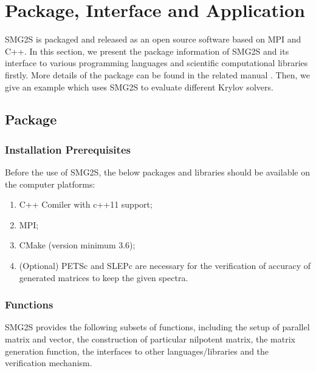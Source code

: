 \section{Package, Interface and Application}\label{Package, Interface and Application}

SMG2S is packaged and released as an open source software based on MPI and C++. In this section, we present the package information of SMG2S and its interface to various programming languages and scientific computational libraries firstly. More details of the package can be found in the related manual \cite{wu2018smg2s}. Then, we give an example which uses SMG2S to evaluate different Krylov solvers. 

\subsection{Package}

\subsubsection{Installation Prerequisites}

Before the use of SMG2S, the below packages and libraries should be available on the computer platforms:

\begin{enumerate}[label=(\arabic*)]
	\item C++ Comiler with c++11 support;
	\item MPI;
	\item CMake (version minimum 3.6);
	\item (Optional) PETSc and SLEPc are necessary for the verification of accuracy of generated matrices to keep the given spectra.
\end{enumerate}

\subsubsection{Functions}

SMG2S provides the following subsets of functions, including the setup of parallel matrix and vector, the construction of particular nilpotent matrix, the matrix generation function, the interfaces to other languages/libraries and the verification mechanism.

